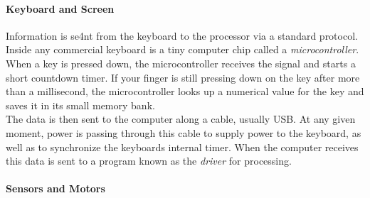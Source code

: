 \documentclass[english]{article}
\begin{document}
\paragraph{Keyboard and Screen}
Information is se4nt from the keyboard to the processor via a standard protocol. Inside any commercial keyboard is a tiny computer chip
called a {\it microcontroller}. When a key is pressed down, the microcontroller receives the signal and starts a short countdown timer. If
your finger is still pressing down on the key after more than a millisecond, the microcontroller looks up a numerical value for the key
and saves it in its small memory bank.
\\The data is then sent to the computer along a cable, usually USB. At any given moment, power
is passing through this cable to supply power to the keyboard, as well as to synchronize the keyboards internal timer. When the
computer receives this data is sent to a program known as the {\it driver} for processing.
\paragraph{Sensors and Motors}
\end{document}

